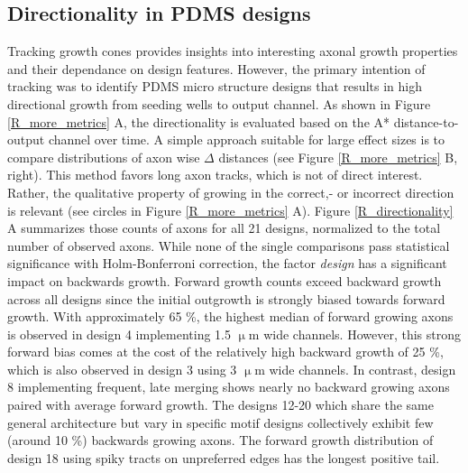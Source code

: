 \subsection{Directionality in PDMS designs}
Tracking growth cones provides insights into interesting axonal growth
properties and their dependance on design features. However, the primary
intention of tracking was to identify PDMS micro structure designs that results
in high directional growth from seeding wells to output channel. As shown in
Figure \ref{R_more_metrics} A, the directionality is evaluated based on the A*
distance-to-output channel over time. A simple approach suitable for large
effect sizes is to compare distributions of axon wise $\Delta$ distances (see
Figure \ref{R_more_metrics} B, right). This method favors long axon tracks,
which is not of direct interest. Rather, the qualitative property of growing in
the correct,- or incorrect direction is relevant (see circles in Figure
\ref{R_more_metrics} A).  Figure \ref{R_directionality} A summarizes those
counts of axons for all 21 designs, normalized to the total number of observed
axons. While none of the single comparisons pass statistical significance with
Holm-Bonferroni correction, the factor \textit{design} has a significant impact
on backwards growth. Forward growth counts exceed backward growth across all
designs since the initial outgrowth is strongly biased towards forward growth.
With approximately 65 \%, the highest median of forward growing axons is
observed in  design 4 implementing 1.5 $\upmu$m wide channels. However, this
strong forward bias comes at the cost of the relatively high backward growth of
25 \%, which is also observed in design 3 using 3 $\upmu$m wide channels. In
contrast, design 8 implementing frequent, late merging shows nearly no backward
growing axons paired with average forward growth. The designs 12-20 which share
the same general architecture but vary in specific motif designs collectively
exhibit few (around 10 \%) backwards growing axons. The forward growth
distribution of design 18 using spiky tracts on unpreferred edges has the
longest positive tail. \\

